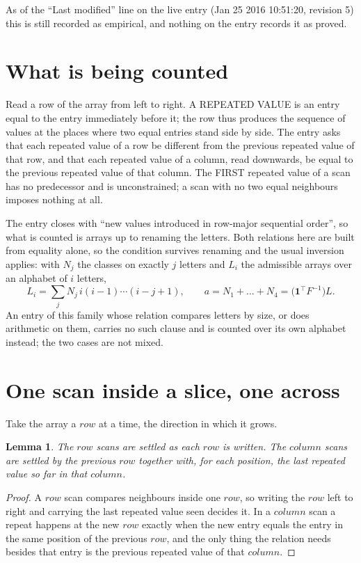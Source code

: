 \documentclass[11pt,a4paper]{article}
\theoremstyle{plain}
\newtheorem{lemma}[theorem]{Lemma}
\theoremstyle{definition}
\begin{document}
As of the ``Last modified'' line on the live entry (Jan 25 2016 10:51:20, revision 5) this is still
recorded as empirical, and nothing on the entry records it as proved.

\section{What is being counted}

Read a row of the array from left to right. A REPEATED VALUE is an entry equal to the entry
immediately before it; the row thus produces the sequence of values at the places where two
equal entries stand side by side. The entry asks that each repeated value of a row be
different from the previous repeated value of that row, and that each repeated value of a column,
read downwards, be equal to the previous repeated value of that column. The FIRST repeated
value of a scan has no predecessor and is unconstrained; a scan with no two equal neighbours
imposes nothing at all.

The entry closes with ``new values introduced in row-major sequential order'', so what is
counted is arrays up to renaming the letters. Both relations here are built from equality
alone, so the condition survives renaming and the usual inversion applies: with $N_j$ the
classes on exactly $j$ letters and $L_i$ the admissible arrays over an alphabet of $i$ letters,
\[
L_i=\sum_j N_j\,i(i-1)\cdots(i-j+1),\qquad
a=N_1+\dots+N_{4}=\bigl(\mathbf{1}^{\!\top}F^{-1}\bigr)L .
\]
An entry of this family whose relation compares letters by size, or does arithmetic on them,
carries no such clause and is counted over its own alphabet instead; the two cases are not
mixed.

\section{One scan inside a slice, one across}

Take the array a $row$ at a time, the direction in which it grows.

\begin{lemma}\label{lem:state}
The $row$ scans are settled as each $row$ is written. The $column$ scans are
settled by the previous $row$ together with, for each position, the last repeated value
so far in that $column$.
\end{lemma}

\begin{proof}
A $row$ scan compares neighbours inside one $row$, so writing the
$row$ left to right and carrying the last repeated value seen decides it. In a
$column$ scan a repeat happens at the new $row$ exactly when the new entry equals the
entry in the same position of the previous $row$, and the only thing the relation needs
besides that entry is the previous repeated value of that $column$.
\end{proof}
\end{document}
